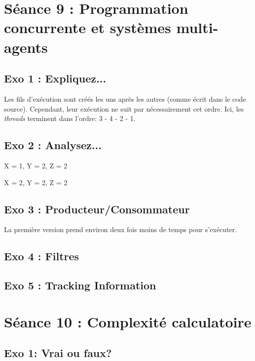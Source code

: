 \newpage
\section{Séance 9 : Programmation concurrente et systèmes multi-agents}
\subsection{Exo 1 : Expliquez...}


Les fils d'exécution sont créés les uns après les autres (comme écrit dans le code source). Cependant, leur exécution ne suit par nécessairement cet ordre.
Ici, les \textit{threads} terminent dans l'ordre: 3 - 4 - 2 - 1. 


\subsection{Exo 2 : Analysez...}

X = 1, Y = 2, Z = 2

X = 2, Y = 2, Z = 2

\subsection{Exo 3 : Producteur/Consommateur}

La première version prend environ deux fois moins de temps pour s'exécuter.


\subsection{Exo 4 : Filtres}



\subsection{Exo 5 : Tracking Information}




\newpage
\section{Séance 10 : Complexité calculatoire}
\subsection{Exo 1: Vrai ou faux?}




















